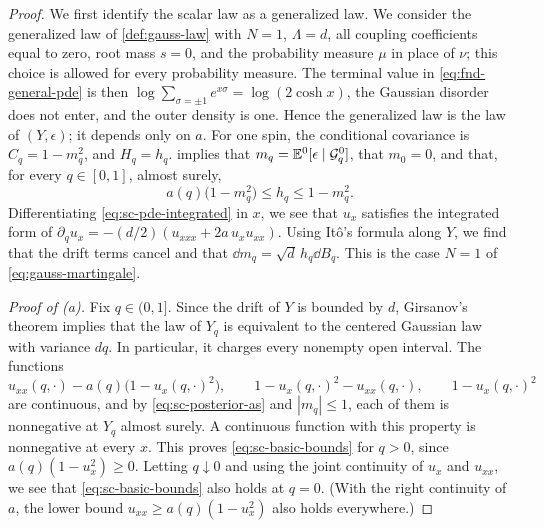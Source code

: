 \begin{proof}
We first identify the scalar law as a generalized law. We consider the
generalized law of \cref{def:gauss-law} with $N=1$, $\Lambda=d$, all
coupling coefficients equal to zero, root mass $s=0$, and the
probability measure $\mu$ in place of $\nu$; this choice is allowed for
every probability measure. The terminal value in
\eqref{eq:fnd-general-pde} is then
$\log\sum_{\sigma=\pm1}e^{x\sigma}=\log(2\cosh x)$, the Gaussian
disorder does not enter, and the outer density is one. Hence the
generalized law is the law of $(Y,\epsilon)$; it depends only on $a$.
For one spin, the conditional covariance is $C_q=1-m_q^2$, and
$H_q=h_q$.
 implies that $m_q=\mathbb E^0[\epsilon\mid\mathcal G^0_q]$,
that $m_0=0$, and that, for every $q\in[0,1]$, almost surely,
\begin{equation}\label{eq:sc-posterior-as}
 a(q)\bigl(1-m_q^2\bigr)\le h_q\le1-m_q^2 .
\end{equation}
Differentiating \eqref{eq:sc-pde-integrated} in $x$, we see that $u_x$
satisfies the integrated form of
$\partial_qu_x=-(d/2)(u_{xxx}+2a\,u_xu_{xx})$. Using Itô's formula
along $Y$, we find that the drift terms cancel and that
$\dd m_q=\sqrt d\,h_q\dd B_q$. This is the case $N=1$ of
\eqref{eq:gauss-martingale}.

\emph{Proof of (a).} Fix $q\in(0,1]$. Since the drift of $Y$ is bounded
by $d$, Girsanov's theorem implies that the law of $Y_q$ is equivalent
to the centered Gaussian law with variance $dq$. In particular, it
charges every nonempty open interval. The functions
\[
 u_{xx}(q,\cdot)-a(q)\bigl(1-u_x(q,\cdot)^2\bigr),\qquad
 1-u_x(q,\cdot)^2-u_{xx}(q,\cdot),\qquad
 1-u_x(q,\cdot)^2
\]
are continuous, and by \eqref{eq:sc-posterior-as} and $|m_q|\le1$, each
of them is nonnegative at $Y_q$ almost surely. A continuous function
with this property is nonnegative at every $x$. This proves \eqref{eq:sc-basic-bounds} for
$q>0$, since $a(q)(1-u_x^2)\ge0$. Letting $q\downarrow0$ and using the
joint continuity of $u_x$ and $u_{xx}$, we see that
\eqref{eq:sc-basic-bounds} also holds at $q=0$. (With the right continuity of
$a$, the lower bound $u_{xx}\ge a(q)(1-u_x^2)$ also holds everywhere.)


\end{proof}
